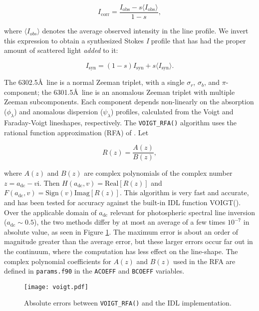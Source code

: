 \documentclass[11pt]{article}
\begin{document}
\begin{equation}
I_{\mathrm{corr}} = \frac{I_{\mathrm{obs}} - s\langle I_{\mathrm{obs}} \rangle}{1-s}, 
\end{equation}

where $\langle I_{obs} \rangle$ denotes the average observed intensity in the line profile.  We
invert this expression to obtain a synthesized Stokes \textit{I} profile that has had the proper
amount of scattered light \textit{added} to it:

\begin{equation}
I_{\mathrm{syn}} = (1-s)I_{\mathrm{syn}} + s\langle I_{\mathrm{syn}} \rangle.
\end{equation}

The 6302.5\AA\ line is a normal Zeeman triplet, with a single $\sigma_{r}$, $\sigma_{b}$, and
$\pi$-component; the 6301.5\AA\ line is an anomalous Zeeman triplet with multiple Zeeman subcomponents.
Each component depends non-linearly on the absorption ($\phi_{\lambda}$) and anomalous dispersion
($\psi_{\lambda}$) profiles, calculated from the Voigt and Faraday-Voigt lineshapes, respectively.
The \texttt{VOIGT\_RFA()} algorithm uses the rational function approximation (RFA) of \citet{hui:1978}.
Let

\begin{equation}
R(z) = \frac{A(z)}{B(z)}, 
\end{equation}

where $A(z)$ and $B(z)$ are complex polynomials of the complex number $z = a_{\mathrm{dc}} - v\mathrm{i}$.
Then $H(a_{\mathrm{dc}},v) = \mathrm{Real}[R(z)]$ and $F(a_{\mathrm{dc}},v) = \mathrm{Sign}(v)\mathrm{Imag}[R(z)]$.
This algorithm is very fast and accurate, and has been tested for accuracy against the built-in IDL 
function VOIGT().  Over the applicable domain of $a_{\mathrm{dc}}$ relevant for photospheric spectral line
inversion ($a_{\mathrm{dc}} \sim 0.5$), the two methods differ by at most an average of a few times
$10^{-7}$ in absolute value, as seen in Figure \ref{fig:voigt}.  The maximum error is about an order of 
magnitude greater than the average error, but these larger errors occur far out in the continuum, where
the computation has less effect on the line-shape.  The complex polynomial coefficients for $A(z)$ and $B(z)$
used in the RFA are defined in \texttt{params.f90} in the \texttt{ACOEFF} and \texttt{BCOEFF} variables.\\

\begin{figure}[!ht]
\centering
\texttt{[image: voigt.pdf]}
\caption{Absolute errors between \texttt{VOIGT\_RFA()} and the IDL implementation.}
\label{fig:voigt}
\end{figure}
\end{document}
